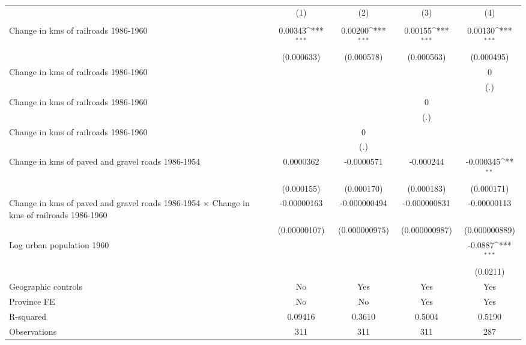 {
\def\sym#1{\ifmmode^{#1}\else\(^{#1}\)\fi}
\begin{tabular}{l*{4}{c}}
\hline\hline
                &\multicolumn{1}{c}{(1)}&\multicolumn{1}{c}{(2)}&\multicolumn{1}{c}{(3)}&\multicolumn{1}{c}{(4)}\\
                &\multicolumn{1}{c}{}&\multicolumn{1}{c}{}&\multicolumn{1}{c}{}&\multicolumn{1}{c}{}\\
\hline
Change in kms of railroads 1986-1960&  0.00343\sym{***}&  0.00200\sym{***}&  0.00155\sym{***}&  0.00130\sym{***}\\
                &(0.000633)         &(0.000578)         &(0.000563)         &(0.000495)         \\
[1em]
Change in kms of railroads 1986-1960&                  &                  &                  &        0         \\
                &                  &                  &                  &      (.)         \\
[1em]
Change in kms of railroads 1986-1960&                  &                  &        0         &                  \\
                &                  &                  &      (.)         &                  \\
[1em]
Change in kms of railroads 1986-1960&                  &        0         &                  &                  \\
                &                  &      (.)         &                  &                  \\
[1em]
Change in kms of paved and gravel roads 1986-1954&0.0000362         &-0.0000571         &-0.000244         &-0.000345\sym{**} \\
                &(0.000155)         &(0.000170)         &(0.000183)         &(0.000171)         \\
[1em]
Change in kms of paved and gravel roads 1986-1954 $\times$ Change in kms of railroads 1986-1960&-0.00000163         &-0.000000494         &-0.000000831         &-0.00000113         \\
                &(0.00000107)         &(0.000000975)         &(0.000000987)         &(0.000000889)         \\
[1em]
Log urban population 1960&                  &                  &                  &  -0.0887\sym{***}\\
                &                  &                  &                  & (0.0211)         \\
\hline
Geographic controls&       No         &      Yes         &      Yes         &      Yes         \\
Province FE     &       No         &       No         &      Yes         &      Yes         \\
R-squared       &  0.09416         &   0.3610         &   0.5004         &   0.5190         \\
Observations    &      311         &      311         &      311         &      287         \\
\hline\hline
\end{tabular}
}

